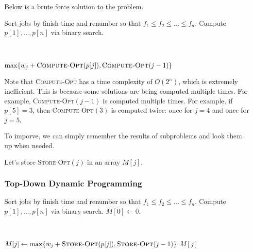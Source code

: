 \newpage
\begin{example}
    Below is a brute force solution to the problem. 

    \begin{algorithm}[ht!]
        \begin{algorithmic}[1]
                \State Sort jobs by finish time and renumber so that $f_1 \leq f_2 \leq \ldots \leq f_n$.
                \State Compute $p[1], \dots, p[n]$ via binary search.
                \State \Return {}
            \EndFunction

            {~~~}

                    \State {}
                \Else
                    \State \Return $\max\{w_j + \Call{Compute-Opt}{p[j]}, \Call{Compute-Opt}{j - 1}\}$
                \EndIf
            \EndFunction
        \end{algorithmic}
    \end{algorithm}

    Note that \textsc{Compute-Opt} has a time complexity of $O(2^n)$, which is extremely inefficient. This is because some solutions are being computed multiple times. For example, \textsc{Compute-Opt}$(j - 1)$ is computed multiple times. For example, if $p[5] = 3$, then \textsc{Compute-Opt}$(3)$ is computed twice: once for $j = 4$ and once for $j = 5$.

    To imporve, we can simply remember the results of subproblems and look them up when needed.
\end{example}

Let's store \textsc{Store-Opt}$(j)$ in an array $M[j]$.

\subsubsection{Top-Down Dynamic Programming}

\begin{algorithm}[ht!]
    \begin{algorithmic}[1]
            \State Sort jobs by finish time and renumber so that $f_1 \leq f_2 \leq \ldots \leq f_n$.
            \State Compute $p[1], \dots, p[n]$ via binary search.
            \State $M[0] \gets 0$.
            \State \Return {}
        \EndFunction

        {~~~}

                \State $M[j] \gets \max\{w_j + \Call{Store-Opt}{p[j]}, \Call{Store-Opt}{j - 1}\}$
            \EndIf
            \State \Return $M[j]$
        \EndFunction
    \end{algorithmic}
\end{algorithm}

